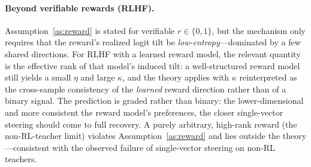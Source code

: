 \documentclass[11pt]{article}
\begin{document}
\paragraph{Beyond verifiable rewards (RLHF).}
Assumption~\ref{as:reward} is stated for verifiable $r\in\{0,1\}$, but the mechanism only requires
that the reward's realized logit tilt be \emph{low-entropy}---dominated by a few shared directions.
For RLHF with a learned reward model, the relevant quantity is the effective rank of that model's
induced tilt: a well-structured reward model still yields a small $\eta$ and large $\kappa$, and the
theory applies with $\kappa$ reinterpreted as the cross-sample consistency of the \emph{learned}
reward direction rather than of a binary signal. The prediction is graded rather than binary: the
lower-dimensional and more consistent the reward model's preferences, the closer single-vector
steering should come to full recovery. A purely arbitrary, high-rank reward (the non-RL-teacher
limit) violates Assumption~\ref{as:reward} and lies outside the theory---consistent with the
observed failure of single-vector steering on non-RL teachers.

\end{document}
